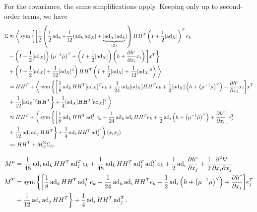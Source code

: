 \documentclass[12pt,class=article,crop=false]{standalone}
\begin{document}
For the covariance, the same simplifications apply. Keeping only up to second-order terms, we have
\begin{align*}
	\dot{ \Sigma} & \approx \bigg\langle \operatorname{sym} \bigg\{ \bigg[ \frac{1}{2} \left( \frac{1}{2} \operatorname{ad}_{ k} + \frac{1}{12} ( \operatorname{ad}_{ k} [ \operatorname{ad}_{ X}] + \underbrace{ [ \operatorname{ad}_{ X}] \operatorname{ad}_{ k}}_{(2)}) \right) HH^{T} \left( I + \frac{1}{2} [ \operatorname{ad}_{ X}] \right)^{T} e_k  \\ 
		      &- \left( I- \frac{1}{2} [ \operatorname{ad}_{ X}] \right) \left( \mu^{-1} \dot{\mu} \right)^\vee + \left( I + \frac{1}{2} [ \operatorname{ad}_{ X}] \right) \left( h + \frac{\partial h^{c}}{\partial x_i} x_i \right)   \bigg] x^{T}  \bigg\} \\
		      &+  \left( I+ \frac{1}{2} [ \operatorname{ad}_{ X}] + \frac{1}{12} [ \operatorname{ad}_{ X}]^2 \right) HH^{T} \left( I+ \frac{1}{2} [ \operatorname{ad}_{ X}] + \frac{1}{12} [ \operatorname{ad}_{ X}]^2 \right) \bigg\rangle \\ 
		      &\approx HH^{T} + \bigg\langle \operatorname{sym} \bigg\{ \bigg[ \frac{1}{8} \operatorname{ad}_{ k} HH^{T} [ \operatorname{ad}_{ X}]^{T} e_k + \frac{1}{24} \operatorname{ad}_{ k} [ \operatorname{ad}_{ X}]HH^{T} e_k + \frac{1}{2} [ \operatorname{ad}_{ X}] \left( h + \left( \mu^{-1} \dot{\mu} \right)^\vee  \right) + \frac{\partial h^{c}}{\partial x_i} x_i \bigg] x^{T} \\ 
	&+ \frac{1}{12} [ \operatorname{ad}_{ X}]^2 HH^{T} \bigg\} + \frac{1}{4} [ \operatorname{ad}_{ X}] H H^{T} [\operatorname{ad}_{ X}]^{T} \bigg\rangle \\
		      &\approx  HH^{T} + \bigg( \operatorname{sym} \bigg\{ \bigg[ \frac{1}{8} \operatorname{ad}_{ k} HH^{T}  \operatorname{ad}_i^{T} e_k + \frac{1}{24} \operatorname{ad}_{ k} \operatorname{ad}_i HH^{T} e_k + \frac{1}{2} \operatorname{ad}_{ i} \left( h + \left( \mu^{-1} \dot{\mu} \right)^\vee  \right) + \frac{\partial h^{c}}{\partial x_i} \bigg] e_j^{T} \\ 
	&+ \frac{1}{12} \operatorname{ad}_{ i} \operatorname{ad}_{ j} HH^{T} \bigg\} + \frac{1}{4} \operatorname{ad}_{ i} H H^{T} \operatorname{ad}_{ j}^{T} \bigg) \left\langle x_i x_j \right\rangle \\
	&=: HH^{T} + M^{ \Sigma}_{ij} \Sigma_{ij} .
\end{align*}

\begin{align*}
	M^{\mu} &= \frac{1}{48} \operatorname{ad}_i \operatorname{ad}_k HH^{T} \operatorname{ad}_{ j} ^{T} e_k + \frac{1}{48} \operatorname{ad}_{ k} HH^{T} \operatorname{ad}_j ^{T} \operatorname{ad}_{ i}^{T} e_k + \frac{1}{2} \operatorname{ad}_{ i} \frac{\partial h^{c}}{\partial x_j} + \frac{1}{2} \frac{\partial^2 h^{c}}{\partial { x_i} \partial x_j}    \\
	M^{ \Sigma} &= \operatorname{sym} \bigg\{ \bigg[ \frac{1}{8} \operatorname{ad}_{ k} HH^{T}  \operatorname{ad}_i^{T} e_k + \frac{1}{24} \operatorname{ad}_{ k} \operatorname{ad}_i HH^{T} e_k + \frac{1}{2} \operatorname{ad}_{ i} \left( h + \left( \mu^{-1} \dot{\mu} \right)^\vee  \right) + \frac{\partial h^{c}}{\partial x_i} \bigg] e_j^{T} \\ 
	&+ \frac{1}{12} \operatorname{ad}_{ i} \operatorname{ad}_{ j} HH^{T} \bigg\} + \frac{1}{4} \operatorname{ad}_{ i} H H^{T} \operatorname{ad}_{ j}^{T} .
\end{align*}
\end{document}
